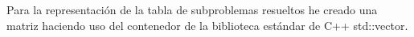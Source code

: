 Para la representaci\'on de la tabla de subproblemas resueltos he creado una matriz haciendo uso del contenedor de la 
biblioteca est\'andar de C++ std::vector.